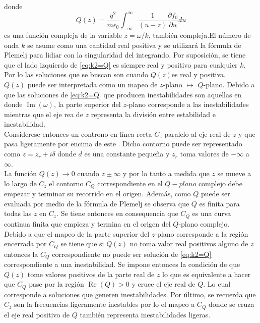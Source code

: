 \documentclass[../tesis_main_file.tex]{subfiles}
\begin{document}
donde
\begin{equation}
\label{eq:Q(z)_integral}
Q(z) = \frac{q^2}{m \epsilon _0}\int^{\infty}_{-\infty} \frac{1}{(u -z)}\frac{\partial f_0}{\partial u}du
\end{equation}
es una función compleja de la variable $z=\omega /k$, también compleja.El número de onda $k$ se asume como una cantidad real positiva y se utilizará la fórmula de Plemelj para lidiar con la singularidad del integrando.
Por suposición, se tiene que el lado izquierdo de \ref{eq:k2=Q} es siempre real y positivo para cualquier $k$. Por lo las soluciones que se buscan son cuando $Q(z)$es real y positiva.\\
$Q(z)$  puede ser interpretada como un mapeo de $z$-plano $\mapsto$ $Q$-plano. Debido a que las soluciones de \ref{eq:k2=Q} que producen inestabilidades son aquellas en donde $\operatorname{Im}(\omega)$, la parte superior del $z$-plano corresponde a las inestabilidades mientras que el eje rea de $z$ representa la división entre estabilidad e inestabilidad.\\
Considerese entonces un controno en línea recta $C_z$ paralelo al eje real de $z$ y que pasa ligeramente por encima de este .
Dicho contorno puede ser representado como $z=z_r + i\delta$ donde $d$ es una constante pequeña y $z_r$ toma valores de $-\infty$ a $\infty$.\\
La función $Q(z) \to 0$ cuando $z \pm \infty$ y por lo tanto a medida que $z$ se mueve a lo largo de $C_z$  el contorno $C_Q$ correspondiente en el $Q-plano$ complejo debe empezar y terminar su recorrido en el origen.
Además, como $Q$ puede ser evaluada por medio de la fórmula de Plemelj se observa que $Q$ es finita para todas las $z$ en $C_z$.
Se tiene entonces en consequencia que $C_Q$ es una curva continua finita que empieza y termina en el origen del $Q$-plano complejo.\\
Debido a que el mapeo de la parte superior del $z$-plano corresponde a la región encerrada por $C_Q$ se tiene que si $Q(z)$ no toma valor real positivos alguno de $z$ entonces  la $C_Q$ correspondiente no puede ser solución de \ref{eq:k2=Q} correspondiente a una inestabilidad. 
Se impone entonces la condición de que $Q(z)$ tome valores positivos de la parte real de $z$ lo que es equivalente a hacer que $C_Q$ pase por la región $\operatorname{Re}(Q) >0$ y cruce el eje real de $Q$.
Lo cual corresponde a soluciones que generen inestabilidades.
Por último, se recuerda que $C_z$ son la frecuencias ligeramente inestables por lo el mapeo a $C_Q$ donde se cruza el eje real positivo de $Q$ también representa inestabilidades ligeras.\\
\end{document}
